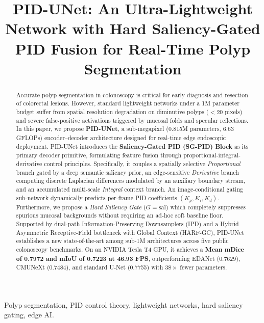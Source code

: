 \documentclass[conference]{IEEEtran}
\begin{document}
\title{PID-UNet: An Ultra-Lightweight Network with Hard Saliency-Gated PID Fusion for Real-Time Polyp Segmentation}

\author{}

\maketitle

\begin{abstract}
Accurate polyp segmentation in colonoscopy is critical for early diagnosis and resection of colorectal lesions. However, standard lightweight networks under a 1M parameter budget suffer from spatial resolution degradation on diminutive polyps ($<20$ pixels) and severe false-positive activations triggered by mucosal folds and specular reflections. In this paper, we propose \textbf{PID-UNet}, a sub-megapixel (0.815M parameters, 6.63 GFLOPs) encoder--decoder architecture designed for real-time edge endoscopic deployment. PID-UNet introduces the \textbf{Saliency-Gated PID (SG-PID) Block} as its primary decoder primitive, formulating feature fusion through proportional-integral-derivative control principles. Specifically, it couples a spatially selective \textit{Proportional} branch gated by a deep semantic saliency prior, an edge-sensitive \textit{Derivative} branch computing discrete Laplacian differences modulated by an auxiliary boundary stream, and an accumulated multi-scale \textit{Integral} context branch. An image-conditional gating sub-network dynamically predicts per-frame PID coefficients $(K_p, K_i, K_d)$. Furthermore, we propose a \textit{Hard Saliency Gate} ($G = \text{sal}$) which completely suppresses spurious mucosal backgrounds without requiring an ad-hoc soft baseline floor. Supported by dual-path Information-Preserving Downsamplers (IPD) and a Hybrid Asymmetric Receptive-Field bottleneck with Global Context (HARF-GC), PID-UNet establishes a new state-of-the-art among sub-1M architectures across five public colonoscopy benchmarks. On an NVIDIA Tesla T4 GPU, it achieves a \textbf{Mean mDice of 0.7972 and mIoU of 0.7223 at 46.93 FPS}, outperforming EDANet (0.7629), CMUNeXt (0.7484), and standard U-Net (0.7755) with $38\times$ fewer parameters.
\end{abstract}

\begin{IEEEkeywords}
Polyp segmentation, PID control theory, lightweight networks, hard saliency gating, edge AI.
\end{IEEEkeywords}
\end{document}
